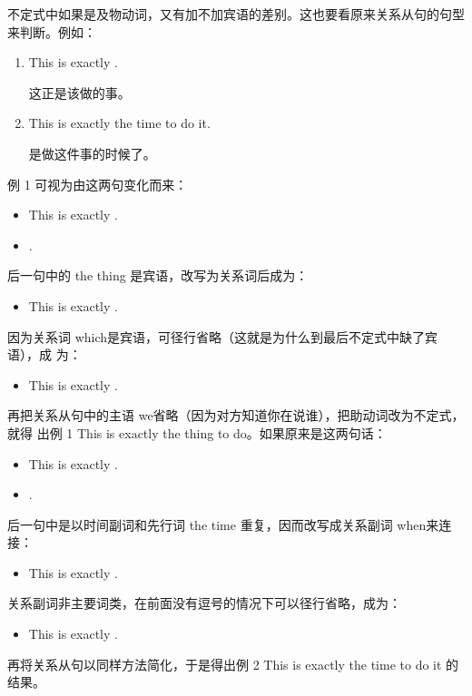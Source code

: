 不定式中如果是及物动词，又有加不加宾语的差别。这也要看原来关系从句的句型来判断。例如：
\begin{enumerate}
\item This is exactly  .

  这正是该做的事。
\item   This is exactly the time to do it.

  是做这件事的时候了。
\end{enumerate}

例 1 可视为由这两句变化而来：
\begin{itemize}
\item This is exactly .
\item {}  .
\end{itemize}
后一句中的 the thing 是宾语，改写为关系词后成为：
\begin{itemize}
\item This is exactly  .
\end{itemize}
因为关系词 which是宾语，可径行省略（这就是为什么到最后不定式中缺了宾语），成
为：
\begin{itemize}
\item This is exactly  .
\end{itemize}

再把关系从句中的主语 we省略（因为对方知道你在说谁），把助动词改为不定式，就得
出例 1 This is exactly the thing to do。如果原来是这两句话：
\begin{itemize}
\item This is exactly .
\item {}   .
\end{itemize}

后一句中是以时间副词和先行词 the time 重复，因而改写成关系副词 when来连接：
\begin{itemize}
\item This is exactly  .
\end{itemize}

关系副词非主要词类，在前面没有逗号的情况下可以径行省略，成为：
\begin{itemize}
\item This is exactly  .
\end{itemize}
再将关系从句以同样方法简化，于是得出例 2 This is exactly the time to do it 的
结果。

